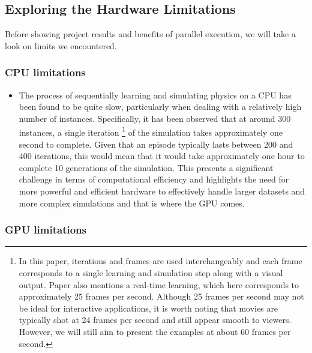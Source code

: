 \subsection{\LARGE Exploring the Hardware Limitations}

Before showing project results and benefits of parallel execution, we will take a look on limits we encountered. 

\subsubsection{\textbf{\large CPU limitations}}

\begin{itemize}
    \item The process of sequentially learning and simulating physics on a CPU has been found to be quite slow, particularly when dealing with a relatively high number of instances. Specifically, it has been observed that at around 300 instances, a single iteration \footnote{In this paper, iterations and frames are used interchangeably and each frame corresponds to a single learning and simulation step along with a visual output. Paper also mentions a real-time learning, which here corresponds to approximately 25 frames per second. Although 25 frames per second may not be ideal for interactive applications, it is worth noting that movies are typically shot at 24 frames per second and still appear smooth to viewers. However, we will still aim to present the examples at about 60 frames per second.} of the simulation takes approximately one second to complete. Given that an episode typically lasts between 200 and 400 iterations, this would mean that it would take approximately one hour to complete 10 generations of the simulation. This presents a significant challenge in terms of computational efficiency and highlights the need for more powerful and efficient hardware to effectively handle larger datasets and more complex simulations and that is where the GPU comes.
\end{itemize}

\subsubsection{\textbf{\large GPU limitations}}

